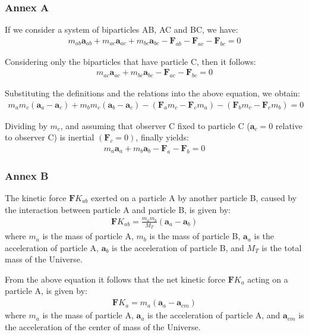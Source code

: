 \documentclass[10pt]{article}
\newcommand{\mM}{m}
\newcommand{\EM}{M}
\newcommand{\ra}{_a}
\newcommand{\rb}{_b}
\newcommand{\rc}{_c}
\newcommand{\rT}{_T}
\newcommand{\rab}{_{ab}}
\newcommand{\rac}{_{ac}}
\newcommand{\rbc}{_{bc}}
\newcommand{\rcm}{_{cm}}
\newcommand{\vA}{\mathbf{a}}
\newcommand{\vF}{\mathbf{F}}
\newcommand{\nK}{{\scriptstyle K}}
\begin{document}
\newpage

{\centering\subsubsection*{Annex A}}

\vspace{+0.60em}

\par If we consider a system of biparticles AB, AC and BC, we have:
\begin{eqnarray*}
\mM\rab\vA\rab + \mM\rac\vA\rac + \mM\rbc\vA\rbc - \vF\rab - \vF\rac - \vF\rbc = 0
\end{eqnarray*}
\par Considering only the biparticles that have particle C, then it follows:
\begin{eqnarray*}
\mM\rac\vA\rac + \mM\rbc\vA\rbc - \vF\rac - \vF\rbc = 0
\end{eqnarray*}
\par Substituting the definitions and the relations into the above equation, we obtain:
\begin{eqnarray*}
\mM\ra\mM\rc(\vA\ra - \vA\rc) + \mM\rb\mM\rc(\vA\rb - \vA\rc) - (\vF\ra\mM\rc - \vF\rc\mM\ra) - (\vF\rb\mM\rc - \vF\rc\mM\rb) = 0
\end{eqnarray*}
\par Dividing by $\mM\rc$, and assuming that observer C fixed to particle C ($\vA\rc = 0$ relative to observer C) is inertial $(\vF\rc = 0)$, finally yields:
\begin{eqnarray*}
\mM\ra\vA\ra + \mM\rb\vA\rb - \vF\ra - \vF\rb = 0
\end{eqnarray*}

\vspace{+0.60em}

{\centering\subsubsection*{Annex B}}

\vspace{+0.60em}

\par The kinetic force $\vF\nK\rab$ exerted on a particle A by another particle B, caused by the interaction between particle A and particle B, is given by:
\begin{eqnarray*}
\vF\nK\rab = \frac{\mM\ra\mM\rb}{\EM\rT}(\vA\ra - \vA\rb)
\end{eqnarray*}
\noindent where $\mM\ra$ is the mass of particle A, $\mM\rb$ is the mass of particle B, $\vA\ra$ is the acceleration of particle A, $\vA\rb$ is the acceleration of particle B, and $\EM\rT$ is the total mass of the Universe.
\par From the above equation it follows that the net kinetic force $\vF\nK\ra$ acting on a particle A, is given by:
\begin{eqnarray*}
\vF\nK\ra = \mM\ra(\vA\ra - \vA\rcm)
\end{eqnarray*}
\noindent where $\mM\ra$ is the mass of particle A, $\vA\ra$ is the acceleration of particle A, and $\vA\rcm$ is the acceleration of the center of mass of the Universe.
\end{document}
